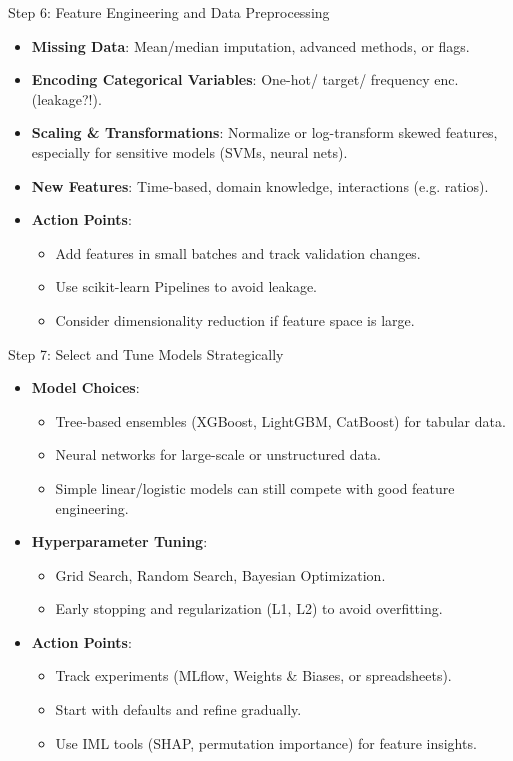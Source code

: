 \documentclass[ignorenonframetext,]{beamer}
\begin{document}
\begin{frame}{Step 6: Feature Engineering and Data Preprocessing}
\begin{itemize}
  \item \textbf{Missing Data}: Mean/median imputation, advanced methods, or flags.
  \item \textbf{Encoding Categorical Variables}: One-hot/ target/ frequency enc. (leakage?!).
  \item \textbf{Scaling \& Transformations}: Normalize or log-transform skewed features, especially for sensitive models (SVMs, neural nets).
  \item \textbf{New Features}: Time-based, domain knowledge, interactions (e.g. ratios).
  \item \textbf{Action Points}:
    \begin{itemize}
      \item Add features in small batches and track validation changes.
      \item Use scikit-learn Pipelines to avoid leakage.
      \item Consider dimensionality reduction if feature space is large.
    \end{itemize}
\end{itemize}
\end{frame}

\begin{frame}{Step 7: Select and Tune Models Strategically}
\begin{itemize}
  \item \textbf{Model Choices}:
    \begin{itemize}
      \item Tree-based ensembles (XGBoost, LightGBM, CatBoost) for tabular data.
      \item Neural networks for large-scale or unstructured data.
      \item Simple linear/logistic models can still compete with good feature engineering.
    \end{itemize}
  \item \textbf{Hyperparameter Tuning}:
    \begin{itemize}
      \item Grid Search, Random Search, Bayesian Optimization.
      \item Early stopping and regularization (L1, L2) to avoid overfitting.
    \end{itemize}
  \item \textbf{Action Points}:
    \begin{itemize}
      \item Track experiments (MLflow, Weights \& Biases, or spreadsheets).
      \item Start with defaults and refine gradually.
      \item Use IML tools (SHAP, permutation importance) for feature insights.
    \end{itemize}
\end{itemize}
\end{frame}
\end{document}
